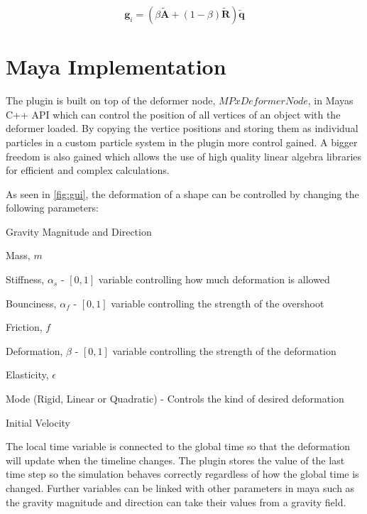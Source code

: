     \begin{equation} \label{eq:newGoal}
        \mathbf{g}_i = (\beta\mathbf{\tilde{A}} + (1 - \beta)\mathbf{\tilde{R}})\mathbf{\tilde{q}}
    \end{equation}
    

\section{Maya Implementation}

The plugin is built on top of the deformer node, $MPxDeformerNode$, in Mayas C++ API which can control the position of all vertices of an object with the deformer loaded. By copying the vertice positions and storing them as individual particles in a custom particle system in the plugin more control gained. A bigger freedom is also gained which allows the use of high quality linear algebra libraries for efficient and complex calculations. 

As seen in \ref{fig:gui}, the deformation of a shape can be controlled by changing the following parameters:

\begin{myitemize} 
  \item Gravity Magnitude and Direction 
  \item Mass, $m$
  \item Stiffness, $\alpha_s$ - $[0,1]$ variable controlling how much deformation is allowed
  \item Bounciness, $\alpha_f$ - $[0,1]$ variable controlling the strength of the overshoot
  \item Friction, $f$
  \item Deformation, $\beta$ - $[0,1]$ variable controlling the strength of the deformation
  \item Elasticity, $\epsilon$
  \item Mode (Rigid, Linear or Quadratic) - Controls the kind of desired deformation 
  \item Initial Velocity 
\end{myitemize}

The local time variable is connected to the global time so that the deformation will update when the timeline changes. The plugin stores the value of the last time step so the simulation behaves correctly regardless of how the global time is changed. Further variables can be linked with other parameters in maya such as the gravity magnitude and direction can take their values from a gravity field.

